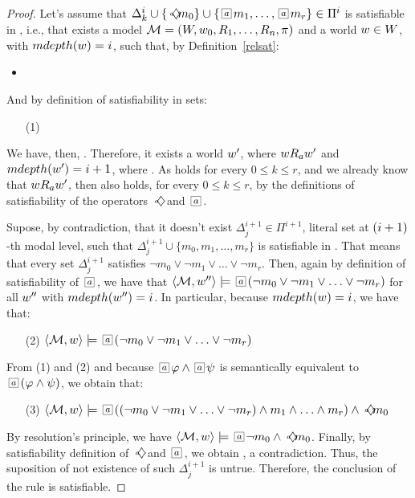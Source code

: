 \begin{proof}
    Let's assume that $\Delta^i_k \cup \{\pos{a}m_0\} \cup \{\nec{a}m_1, \ldots,
    \nec{a}m_r\} \in \Pi^i$ is satisfiable in , i.e., that exists
    a model $\Model = (W, \st_0, R_1, \ldots, R_n, \pi)$ and a world $\st \in
    W$, with $mdepth(\st) = \ml$, such that, by Definition~\ref{relsat}:
    \begin{itemize}
        \item
    \end{itemize}
    And by definition of satisfiability in sets:
    \begin{itemize}
        \item[(1)]
    \end{itemize}
    We have, then, . Therefore, it exists a world
    $\st'$, where $\st R_a \st'$ and $mdepth(\st')=\ml + 1$, where
    . As  holds for every $0
    \leq k \leq r$, and we already know that $\st R_a \st'$, then
     also holds, for every $0 \leq k \leq r$, by the
    definitions of satisfiability of the operators $\pos{a}$ and $\nec{a}$.

    Supose, by contradiction, that it doesn't exist $\Delta^{i+1}_j \in
    \Pi^{i+1}$, literal set at $(\ml+1)$-th modal level, such that
    $\Delta^{i+1}_j\cup\{m_0,m_1,\ldots,m_r\}$ is satisfiable in \Model. That
    means that every set $\Delta^{i+1}_j$ satisfies $\neg m_0 \lor \neg m_1 \lor
    \ldots \lor \neg m_r$. Then, again by definition of satisfiability of
    $\nec{a}$, we have that $\sat{\Model}{\st''}{\nec{a}(\neg m_0\lor\neg
    m_1\lor\ldots\lor\neg m_r)}$ for all $\st''$ with $mdepth(\st'')=i$. In
    particular, because $mdepth(\st) = i$, we have that:
    \begin{itemize}
        \item[(2)] $\sat{\Model}{\st}{\nec{a}(\neg m_0 \lor \neg m_1 \lor \ldots
            \lor \neg m_r)}$
    \end{itemize}
    From (1) and (2) and because $\nec{a}\formula\land\nec{a}\psi$ is
    semantically equivalent to $\nec{a}(\formula\land\psi)$, we obtain that:
    \begin{itemize}
        \item[(3)] $\sat{\Model}{\st}{\nec{a}((\neg m_0 \lor \neg m_1 \lor
                \ldots \lor \neg m_r)\land m_1 \land \ldots \land m_r) \land
            \pos{a} m_0}$ 
    \end{itemize}
    By resolution's principle, we have $\sat{\Model}{\st}{\nec{a}\neg m_0 \land
    \pos{a}m_0}$. Finally, by satisfiability definition of $\pos{a}$ and
    $\nec{a}$, we obtain , a contradiction.
    Thus, the suposition of not existence of such $\Delta^{i+1}_j$ is untrue.
    Therefore, the conclusion of the rule is satisfiable.
\end{proof}

